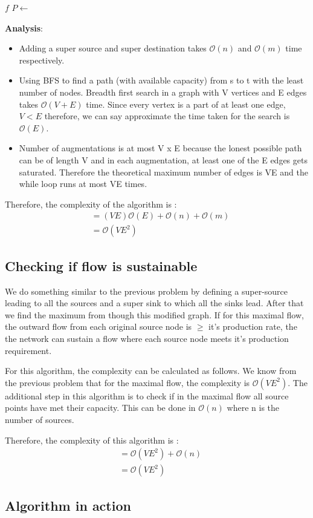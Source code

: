 \documentclass{article}
\begin{document}
\begin{algorithmic}
	\State {} $f$
		\State $P \gets $ 
		\State {}
		\State {}
		\State {}
	\EndWhile
\EndFunction
\end{algorithmic}

\textbf{Analysis}: 
\begin{itemize}
\item Adding a super source and super destination takes $\mathcal{O}(n)$ and $\mathcal{O}(m)$ time respectively.
\item Using BFS to find a path (with available capacity) from s to t with the least number of nodes. Breadth first search in a graph with V vertices and E edges takes $\mathcal{O}(V+E)$ time. Since every vertex is a part of at least one edge,  $V < E$ therefore, we can say approximate the time taken for the search is $\mathcal{O}(E)$.
\item Number of augmentations is at most V x E because the lonest possible path can be of length V and in each augmentation, at least one of the E edges gets saturated. Therefore the theoretical maximum number of edges is VE and the while loop runs at most VE times.
\end{itemize}

Therefore, the complexity of the algorithm is :
\begin{align*}
 & = (VE)\mathcal{O}(E) + \mathcal{O}(n) + \mathcal{O}(m) \\
 & = \mathcal{O}(VE^2)
\end{align*}

\subsection{Checking if flow is sustainable}
We do something similar to the previous problem by defining a super-source leading to all the sources and a super sink to which all the sinks lead. After that we find the maximum from though this modified graph. If for this maximal flow, the outward flow from each original source node is $\geq$ it's production rate, the the network can sustain a flow where each source node meets it's production requirement. 

For this algorithm, the complexity can be calculated as follows. We know from the previous problem that for the maximal flow, the complexity is $\mathcal{O}(VE^2)$. The additional step in this algorithm is to check if in the maximal flow all source points have met their capacity. This can be done in $\mathcal{O}(n)$ where n is the number of sources.

Therefore, the complexity of this algorithm is :
\begin{align*}
 & = \mathcal{O}(VE^2) + \mathcal{O}(n) \\
 & = \mathcal{O}(VE^2)
\end{align*}

\subsection{Algorithm in action}
\end{document}
